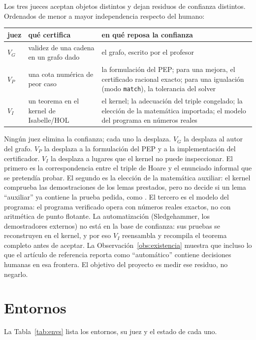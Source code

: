 \documentclass[11pt,a4paper]{article}
\theoremstyle{definition}
\theoremstyle{remark}
\newcommand{\id}[1]{\texttt{\detokenize{#1}}}
\begin{document}
Los tres jueces aceptan objetos distintos y dejan residuos de confianza distintos. Ordenados de menor a mayor independencia respecto del humano:

\begin{center}
\small
\begin{tabular}{@{}lp{4.6cm}p{7.4cm}@{}}
\toprule
juez & qué certifica & en qué reposa la confianza \\
\midrule
$V_G$ & validez de una cadena en un grafo dado & el grafo, escrito por el profesor \\
$V_P$ & una cota numérica de peor caso & la formulación del PEP; para una mejora, el certificado racional exacto; para una igualación (modo \texttt{match}), la tolerancia del solver \\
$V_I$ & un teorema en el kernel de Isabelle/HOL & el kernel; la adecuación del triple congelado; la elección de la matemática importada; el modelo del programa en números reales \\
\bottomrule
\end{tabular}
\end{center}

Ningún juez elimina la confianza; cada uno la desplaza. $V_G$ la desplaza al autor del grafo. $V_P$ la desplaza a la formulación del PEP y a la implementación del certificador. $V_I$ la desplaza a lugares que el kernel no puede inspeccionar. El primero es la correspondencia entre el triple de Hoare y el enunciado informal que se pretendía probar. El segundo es la elección de la matemática auxiliar: el kernel comprueba las demostraciones de los lemas prestados, pero no decide si un lema ``auxiliar'' ya contiene la prueba pedida, como \id{bisect_root_extract}. El tercero es el modelo del programa: el programa verificado opera con números reales exactos, no con aritmética de punto flotante. La automatización (Sledgehammer, los demostradores externos) no está en la base de confianza: sus pruebas se reconstruyen en el kernel, y por eso $V_I$ reensambla y recompila el teorema completo antes de aceptar. La Observación~\ref{obs:existencia} muestra que incluso lo que el artículo de referencia reporta como ``automático'' contiene decisiones humanas en esa frontera. El objetivo del proyecto es medir ese residuo, no negarlo.

\section{Entornos}\label{sec:entornos}

La Tabla~\ref{tab:envs} lista los entornos, su juez y el estado de cada uno.
\end{document}
